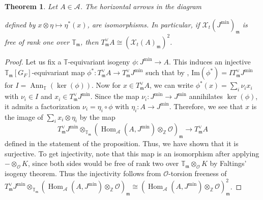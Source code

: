\documentclass[a4paper, notitlepage, 10pt]{amsart}
\theoremstyle{plain} %
\newtheorem{theorem}{Theorem}[section]
\theoremstyle{definition} %
\theoremstyle{remark} %
\numberwithin{equation}{section}
\newcommand{\bbT}{\mathbb T}
\newcommand{\bbZ}{\mathbb Z}
\newcommand{\Ann}{\operatorname{Ann}} %
\newcommand{\Hom}{\operatorname{Hom}} %
\newcommand{\tf}{\operatorname{tf}} %
\begin{document}
\begin{theorem}\label{tatemoduletochargrp}
    Let $A\in \mathcal{A}$. The horizontal arrows in the diagram
\begin{center}
\end{center}
defined by $x\otimes \eta \mapsto \eta^*(x)$, are isomorphisms. In particular, if $\mathcal{X}_t(J^{\min})_{\mathfrak{m}}$ is free of rank one over $\bbT_{\mathfrak{m}}$, then $T^\vee_{\mathfrak{m}}A\cong (\mathcal{X}_t(A)_{\mathfrak{m}})^2$.
\end{theorem}
\begin{proof}
    Let us fix a $\bbT$-equivariant isogeny $\phi\colon J^{\min}\to A$. This induces an injective $\bbT_{\mathfrak{m}}[G_F]$-equivariant map $\phi^*\colon T_{\mathfrak{m}}^\vee A \to T^\vee_{\mathfrak{m}}J^{\min}$ such that by , $\mathrm{Im}(\phi^*)=I T^\vee_{\mathfrak{m}}J^{\min}$ for $I=\Ann_{\bbT}(\ker(\phi))$. Now for $x\in T_{\mathfrak{m}}^\vee A$, we can write $\phi^*(x)=\sum_i \nu_i x_i$ with $\nu_i\in I$ and $x_i\in T_{\mathfrak{m}}^\vee J^{\min}$. Since the map $\nu_i\colon J^{\min}\to J^{\min}$ annihilates $\ker(\phi)$, it admits a factorization $\nu_i=\eta_i \circ \phi$ with $\eta_i\colon A\to J^{\min}$. Therefore, we see that $x$ is the image of $\sum_i x_i\otimes \eta_i$ by the map 
    $$ T_{\mathfrak{m}}^\vee J^{\min} \otimes_{\bbT_{\mathfrak{m}}} (\Hom_{\mathcal{A}}(A,J^{\min})\otimes_{\bbZ}\mathcal{O})_{\mathfrak{m}}\longrightarrow  T_{\mathfrak{m}}^\vee A $$
    defined in the statement of the proposition. Thus, we have shown that it is surjective. To get injectivity, note that this map is an isomorphism after applying $-\otimes_{\mathcal{O}} K$, since both sides would be free of rank two over $\bbT_{\mathfrak{m}}\otimes_{\mathcal{O}} K$ by Faltings' isogeny theorem. Thus the injectivity follows from $\mathcal{O}$-torsion freeness of $T_{\mathfrak{m}}^\vee J^{\min} \otimes_{\bbT_{\mathfrak{m}}} (\Hom_{\mathcal{A}}(A,J^{\min})\otimes_{\bbZ}\mathcal{O})_{\mathfrak{m}}\cong (\Hom_{\mathcal{A}}(A,J^{\min})\otimes_{\bbZ}\mathcal{O})_{\mathfrak{m}}^2$.
\end{proof}
\end{document}
